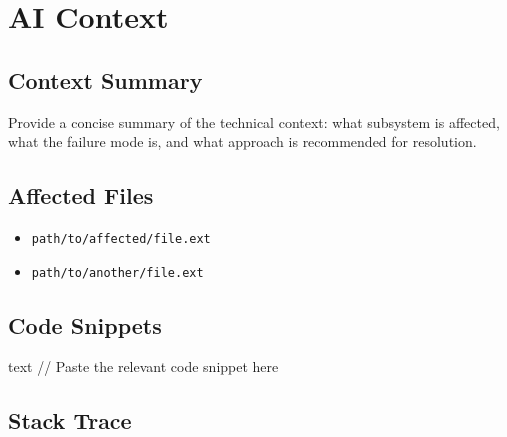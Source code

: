 \needspace{8cm}
\section{AI Context}


\subsection{Context Summary}


\begin{keyinsight}
Provide a concise summary of the technical context: what subsystem is
affected, what the failure mode is, and what approach is recommended
for resolution.
\end{keyinsight}

\subsection{Affected Files}


\begin{itemize}
    \item \texttt{path/to/affected/file.ext}
    \item \texttt{path/to/another/file.ext}
\end{itemize}

\subsection{Code Snippets}


\begin{wyrdcode}{text}
// Paste the relevant code snippet here
\end{wyrdcode}

\subsection{Stack Trace}

